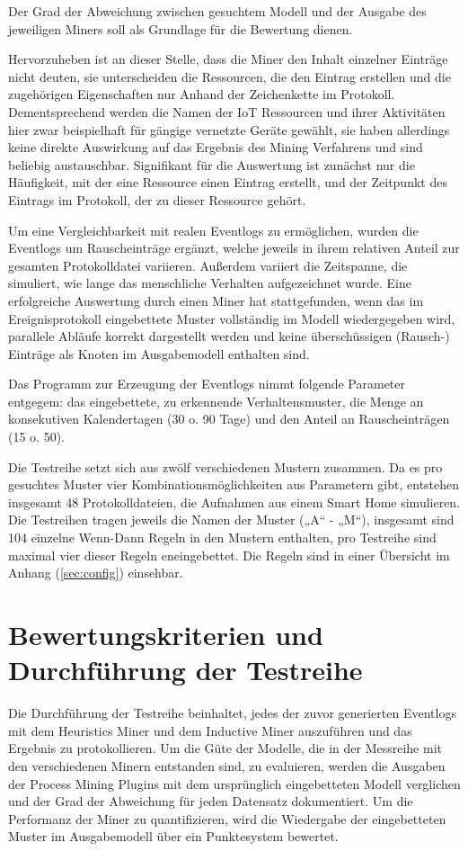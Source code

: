 Der Grad der Abweichung zwischen gesuchtem Modell und der Ausgabe des jeweiligen Miners soll als Grundlage für die Bewertung dienen.

Hervorzuheben ist an dieser Stelle, dass die Miner den Inhalt einzelner Einträge nicht deuten, sie unterscheiden die Ressourcen, die den Eintrag erstellen und die zugehörigen Eigenschaften nur Anhand der Zeichenkette im Protokoll. Dementsprechend werden die Namen der IoT Ressourcen und ihrer Aktivitäten hier zwar beispielhaft für gängige vernetzte Geräte gewählt, sie haben allerdings keine direkte Auswirkung auf das Ergebnis des Mining Verfahrens und sind beliebig austauschbar. Signifikant für die Auswertung ist zunächst nur die Häufigkeit, mit der eine Ressource einen Eintrag erstellt, und der Zeitpunkt des Eintrags im Protokoll, der zu dieser Ressource gehört.

Um eine Vergleichbarkeit mit realen Eventlogs zu ermöglichen, wurden die Eventlogs um Rauscheinträge ergänzt, welche jeweils in ihrem relativen Anteil zur gesamten Protokolldatei variieren. Außerdem variiert die Zeitspanne, die simuliert, wie lange das menschliche Verhalten aufgezeichnet wurde. Eine erfolgreiche Auswertung durch einen Miner hat stattgefunden, wenn das im Ereignisprotokoll eingebettete Muster vollständig im Modell wiedergegeben wird, parallele Abläufe korrekt dargestellt werden und keine überschüssigen (Rausch-) Einträge als Knoten im Ausgabemodell enthalten sind.

Das Programm zur Erzeugung der Eventlogs nimmt folgende Parameter entgegem: das eingebettete, zu erkennende Verhaltensmuster, die Menge an konsekutiven Kalendertagen (30 o. 90 Tage) und den Anteil an Rauscheinträgen (15 o. 50). 

Die Testreihe setzt sich aus zwölf verschiedenen Mustern zusammen. Da es pro gesuchtes Muster vier Kombinationsmöglichkeiten aus Parametern gibt, entstehen insgesamt 48 Protokolldateien, die Aufnahmen aus einem Smart Home simulieren. Die Testreihen tragen jeweils die Namen der Muster („A“ - „M“), insgesamt sind 104 einzelne Wenn-Dann Regeln in den Mustern enthalten, pro Testreihe sind maximal vier dieser Regeln eneingebettet. Die Regeln sind in einer Übersicht im Anhang (\ref{sec:config}) einsehbar. 

\section{Bewertungskriterien und Durchführung der Testreihe}\label{sec:tests}
Die Durchführung der Testreihe beinhaltet, jedes der zuvor generierten Eventlogs mit dem Heuristics Miner und dem Inductive Miner auszuführen und das Ergebnis zu protokollieren. Um die Güte der Modelle, die in der Messreihe mit den verschiedenen Minern entstanden sind, zu evaluieren, werden die Ausgaben der Process Mining Plugins mit dem ursprünglich eingebetteten Modell verglichen und der Grad der Abweichung für jeden Datensatz dokumentiert. Um die Performanz der Miner zu quantifizieren, wird die Wiedergabe der eingebetteten Muster im Ausgabemodell über ein Punktesystem bewertet. 


